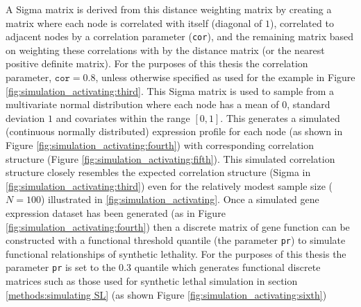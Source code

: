 A Sigma matrix is derived from this distance weighting matrix by creating a matrix where each node is correlated with itself (diagonal of $1$), correlated to adjacent nodes by a correlation parameter (\texttt{cor}), and the remaining matrix based on weighting these correlations with by the distance matrix (or the nearest positive definite matrix). For the purposes of this thesis the correlation parameter, $\texttt{cor} = 0.8$, unless otherwise specified as used for the example in Figure \ref{fig:simulation_activating:third}. This Sigma matrix is used to sample from a multivariate normal distribution where each node has a mean of $0$, standard deviation $1$ and covariates within the range $[0,1]$. This generates a simulated (continuous normally distributed) expression profile for each node (as shown in Figure \ref{fig:simulation_activating:fourth}) with corresponding correlation structure (Figure \ref{fig:simulation_activating:fifth}). This simulated correlation structure closely resembles the expected correlation structure (Sigma in \ref{fig:simulation_activating:third}) even for the relatively modest sample size ($N=100$) illustrated in \ref{fig:simulation_activating}. Once a simulated gene expression dataset has been generated (as in Figure \ref{fig:simulation_activating:fourth}) then a discrete matrix of gene function can be constructed with a functional threshold quantile (the parameter \texttt{pr}) to simulate functional relationships of synthetic lethality. For the purposes of this thesis the parameter \texttt{pr} is set to the 0.3 quantile which generates functional discrete matrices such as those used for synthetic lethal simulation in section \ref{methods:simulating SL} (as shown Figure \ref{fig:simulation_activating:sixth})

